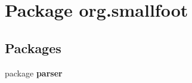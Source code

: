 \section{Package org.\+smallfoot}
\label{namespaceorg_1_1smallfoot}
\subsection*{Packages}
\begin{DoxyCompactItemize}
\item 
package {\bf parser}
\end{DoxyCompactItemize}
